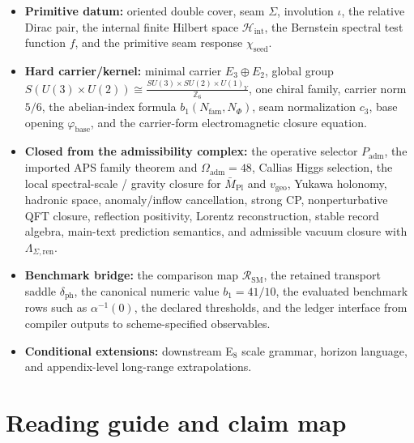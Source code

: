 \documentclass[11pt,a4paper]{article}
\theoremstyle{definition}
\theoremstyle{remark}
\newcommand{\Seam}{\Sigma}
\newcommand{\inv}{\iota}
\newcommand{\Mpl}{\bar M_{\mathrm{Pl}}}
\newcommand{\cthree}{c_3}
\newcommand{\phibase}{\varphi_{\mathrm{base}}}
\newcommand{\bone}{b_1}
\newcommand{\SM}{\mathrm{SM}}
\newcommand{\Oadm}{\Omega_{\mathrm{adm}}}
\newcommand{\Hint}{\mathcal H_{\mathrm{int}}}
\newcommand{\chiseed}{\chi_{\mathrm{seed}}}
\newcommand{\vgeo}{v_{\mathrm{geo}}}
\newcommand{\Padm}{P_{\mathrm{adm}}}
\begin{document}
\begin{tcolorbox}[colback=gray!5, colframe=gray!60, breakable,
    title={\textbf{Reading Status for the Present Paper}}, fonttitle=\bfseries]
\begin{itemize}[leftmargin=1.5em, topsep=3pt, itemsep=3pt]
    \item \textbf{Primitive datum:} oriented double cover, seam $\Seam$, involution $\inv$, the relative Dirac pair, the internal finite Hilbert space $\Hint$, the Bernstein spectral test function $f$, and the primitive seam response $\chiseed$.
    \item \textbf{Hard carrier/kernel:} minimal carrier $E_3\oplus E_2$, global group $S(U(3)\times U(2))\cong \frac{SU(3)\times SU(2)\times U(1)_Y}{\mathbb Z_6}$, one chiral family, carrier norm $5/6$, the abelian-index formula $\bone(N_{\mathrm{fam}},N_\Phi)$, seam normalization $\cthree$, base opening $\phibase$, and the carrier-form electromagnetic closure equation.
    \item \textbf{Closed from the admissibility complex:} the operative selector $\Padm$, the imported APS family theorem and $\Oadm=48$, Callias Higgs selection, the local spectral-scale / gravity closure for $\Mpl$ and $\vgeo$, Yukawa holonomy, hadronic space, anomaly/inflow cancellation, strong CP, nonperturbative QFT closure, reflection positivity, Lorentz reconstruction, stable record algebra, main-text prediction semantics, and admissible vacuum closure with $\Lambda_{\Seam,\mathrm{ren}}$.
    \item \textbf{Benchmark bridge:} the comparison map $\mathcal R_{\SM}$, the retained transport saddle $\delta_{\mathrm{ph}}$, the canonical numeric value $\bone=41/10$, the evaluated benchmark rows such as $\alpha^{-1}(0)$, the declared thresholds, and the ledger interface from compiler outputs to scheme-specified observables.
    \item \textbf{Conditional extensions:} downstream E$_8$ scale grammar, horizon language, and appendix-level long-range extrapolations.
\end{itemize}
\end{tcolorbox}

\tableofcontents

\section{Reading guide and claim map}
\end{document}
